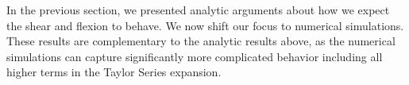 In the previous section, we presented analytic arguments about how we expect the shear and flexion to behave. We now shift our focus to numerical simulations. These results are complementary to the analytic results above, as the numerical simulations can capture significantly more complicated behavior including all higher terms in the Taylor Series expansion. 
